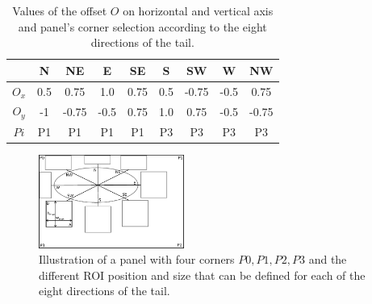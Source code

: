   \begin{table}[ht]
    \normalsize

    \centering
    \caption{Values of the offset $O$ on horizontal and vertical axis and panel's corner selection according to the eight directions of the tail.}
    \setlength{\tabcolsep}{.45em}
    \begin{tabular}{|c|c|c|c|c|c|c|c|c|}

          \hline
	      &  N  & NE  & E  & SE & S & SW & W & NW   \\
	      \hline
	      $O_x$   & 0.5  & 0.75 & 1.0  & 0.75 & 0.5 & -0.75& -0.5 & 0.75  \\
	      \hline
	      $O_y$   & -1   & -0.75& -0.5 & 0.75 & 1.0 & 0.75 & -0.5 & -0.75  \\
	      \hline
	      $Pi$    & P1   & P1   & P1   & P1   & P3  & P3   & P3   & P3   \\
          \hline
        \end{tabular}
    \label{tab:offset_panel_corner}
  \end{table}%




 \begin{figure}[!ht]
   \centering
  \includegraphics[width=180px]{roi_hypothesis.pdf}
  \caption{Illustration of a panel with four corners $P0, P1, P2, P3$ and the different ROI position and size that can be defined for each of the eight directions of the tail.
  }
  \label{fig:se:roi_area}
 \end{figure}

